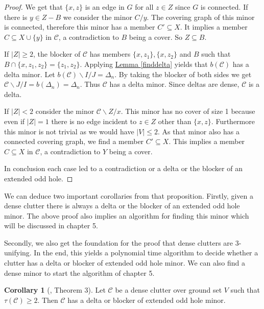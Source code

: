 \documentclass[a4paper, 12pt, twoside=false]{scrbook}
\theoremstyle{definition}
\newtheorem{corollary}[theorem]{Corollary}
\begin{document}
\begin{proof}
       We get that $\{x,z\}$ is an edge in $G$ for all $z \in Z$ since $G$ is connected.
       If there is $y \in Z-B$ we consider the minor $C / y$.
       The covering graph of this minor is connected, therefore this minor has a member $C' \subseteq X$. It implies a member $C \subseteq X \cup \{y\}$ in $\mathcal{C}$, a contradiction to $B$ being a cover. So $Z \subseteq B$.

       If $|Z|\geq 2$, the blocker of $\mathcal{C}$ has members $\{x,z_1\},\{x,z_2\}$ and $B$ such that $B \cap \{x,z_1,z_2\}=\{z_1,z_2\}$. Applying \hyperref[finddelta]{Lemma \ref*{finddelta}} yields that $b(\mathcal{C})$ has a delta minor. Let $b(\mathcal{C})\backslash I /J=\Delta_n$. By taking the blocker of both sides we get $\mathcal{C} \backslash J / I = b(\Delta_n)=\Delta_n$.
       Thus $\mathcal{C}$ has a delta minor. Since deltas are dense, $\mathcal{C}$ is a delta.

       If $|Z|<2$ consider the minor $\mathcal{C}\backslash Z /x$. This minor has no cover of size 1 because even if $|Z|=1$ there is no edge incident to $z \in Z$ other than $\{x,z\}$. Furthermore this minor is not trivial as we would have $|V|\leq 2$.
       As that minor also has a connected covering graph, we find a member $C' \subseteq X$. This implies a member $C \subseteq X$ in $\mathcal{C}$, a contradiction to $Y$ being a cover.

       In conclusion each case led to a contradiction or a delta or the blocker of an extended odd hole.
   \end{proof}

   We can deduce two important corollaries from that proposition. Firstly, given a dense clutter there is always a delta or the blocker of an extended odd hole minor. The above proof also implies an algorithm for finding this minor which will be discussed in chapter 5.

   Secondly, we also get the foundation for the proof that dense clutters are 3-unifying. In the end, this yields a polynomial time algorithm to decide whether a clutter has a delta or blocker of extended odd hole minor. We can also find a dense minor to start the algorithm of chapter 5.

   \begin{corollary}[\cite{deltas}, Theorem 3]\label{findminor}
       Let $\mathcal{C}$ be a dense clutter over ground set $V$ such that $\tau(\mathcal{C}) \geq 2$.
       Then $\mathcal{C}$ has a delta or blocker of extended odd hole minor.
   \end{corollary}
\end{document}
